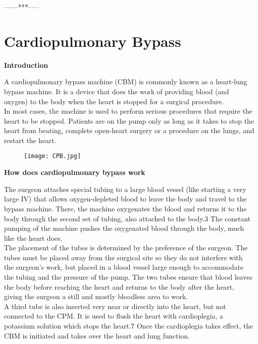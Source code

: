 \documentclass[12pt]{article}
\begin{document}
\vspace{1cm}
\centering\huge ------***-----
\pagebreak


\section{\centering\Huge\textbf{Cardiopulmonary Bypass}}

\LARGE\flushleft\textbf{Introduction}

\large\flushleft A cardiopulmonary bypass machine (CBM) is commonly known as a heart-lung bypass machine. It is a device that does the work of providing blood (and oxygen) to the body when the heart is stopped for a surgical procedure.\\


In most cases, the machine is used to perform serious procedures that require the heart to be stopped. Patients are on the pump only as long as it takes to stop the heart from beating, complete open-heart surgery or a procedure on the lungs, and restart the heart.

\vspace{1cm}
\begin{figure}[h]
\centering
\texttt{[image: CPB.jpg]}
\end{figure}

\pagebreak

\LARGE\flushleft\textbf{How does cardiopulmonary bypass work}

\large\flushleft The surgeon attaches special tubing to a large blood vessel (like starting a very large IV) that allows oxygen-depleted blood to leave the body and travel to the bypass machine. There, the machine oxygenates the blood and returns it to the body through the second set of tubing, also attached to the body.3 The constant pumping of the machine pushes the oxygenated blood through the body, much like the heart does.\\

The placement of the tubes is determined by the preference of the surgeon. The tubes must be placed away from the surgical site so they do not interfere with the surgeon’s work, but placed in a blood vessel large enough to accommodate the tubing and the pressure of the pump. The two tubes ensure that blood leaves the body before reaching the heart and returns to the body after the heart, giving the surgeon a still and mostly bloodless area to work.\\


A third tube is also inserted very near or directly into the heart, but not connected to the CPM. It is used to flush the heart with cardioplegia, a potassium solution which stops the heart.7 Once the cardioplegia takes effect, the CBM is initiated and takes over the heart and lung function.\\
\end{document}
